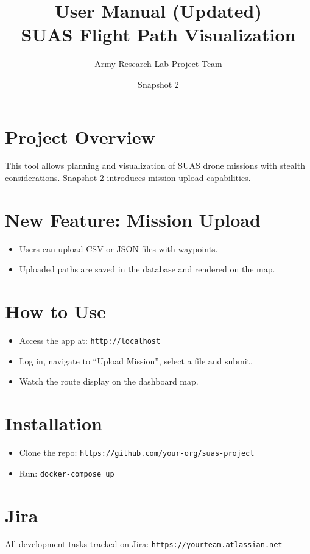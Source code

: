 \documentclass[12pt]{article}
\title{User Manual (Updated)\\SUAS Flight Path Visualization}
\author{Army Research Lab Project Team}
\date{Snapshot 2}
\begin{document}
\maketitle

\section{Project Overview}
This tool allows planning and visualization of SUAS drone missions with stealth considerations. Snapshot 2 introduces mission upload capabilities.

\section{New Feature: Mission Upload}
\begin{itemize}
  \item Users can upload CSV or JSON files with waypoints.
  \item Uploaded paths are saved in the database and rendered on the map.
\end{itemize}

\section{How to Use}
\begin{itemize}
  \item Access the app at: \texttt{http://localhost}
  \item Log in, navigate to “Upload Mission”, select a file and submit.
  \item Watch the route display on the dashboard map.
\end{itemize}

\section{Installation}
\begin{itemize}
  \item Clone the repo: \texttt{https://github.com/your-org/suas-project}
  \item Run: \texttt{docker-compose up}
\end{itemize}

\section{Jira}
All development tasks tracked on Jira: \texttt{https://yourteam.atlassian.net}
\end{document}

